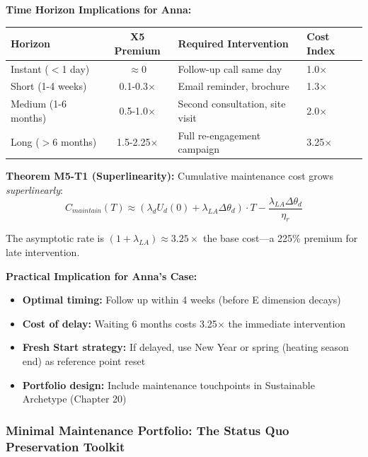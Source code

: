 \textbf{Time Horizon Implications for Anna:}

\begin{center}
\renewcommand{\arraystretch}{1.3}
\begin{tabular}{@{}lcll@{}}
\toprule
\textbf{Horizon} & \textbf{X5 Premium} & \textbf{Required Intervention} & \textbf{Cost Index} \\
\midrule
Instant ($<$1 day) & $\approx 0$ & Follow-up call same day & 1.0$\times$ \\
Short (1-4 weeks) & 0.1-0.3$\times$ & Email reminder, brochure & 1.3$\times$ \\
Medium (1-6 months) & 0.5-1.0$\times$ & Second consultation, site visit & 2.0$\times$ \\
Long ($>$6 months) & 1.5-2.25$\times$ & Full re-engagement campaign & 3.25$\times$ \\
\bottomrule
\end{tabular}
\end{center}

\textbf{Theorem M5-T1 (Superlinearity):} Cumulative maintenance cost grows \emph{superlinearly}:
\begin{equation}
C_{maintain}(T) \approx (\lambda_d U_d(0) + \lambda_{LA} \Delta\theta_d) \cdot T - \frac{\lambda_{LA} \Delta\theta_d}{\eta_r}
\end{equation}

The asymptotic rate is $(1 + \lambda_{LA}) \approx 3.25\times$ the base cost---a 225\% premium for late intervention.

\textbf{Practical Implication for Anna's Case:}
\begin{itemize}[nosep]
\item \textbf{Optimal timing:} Follow up within 4 weeks (before E dimension decays)
\item \textbf{Cost of delay:} Waiting 6 months costs 3.25$\times$ the immediate intervention
\item \textbf{Fresh Start strategy:} If delayed, use New Year or spring (heating season end) as reference point reset
\item \textbf{Portfolio design:} Include maintenance touchpoints in Sustainable Archetype (Chapter 20)
\end{itemize}

\subsubsection{Minimal Maintenance Portfolio: The Status Quo Preservation Toolkit}


